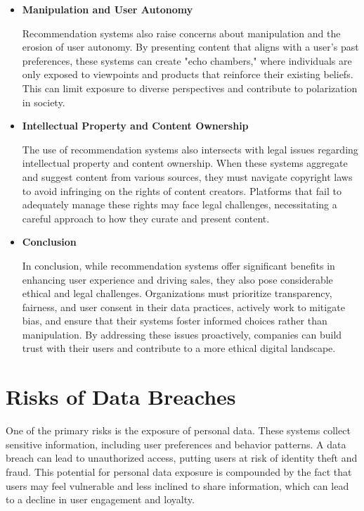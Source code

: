 \documentclass[10pt,twoside,slovak,a4paper]{article}
\begin{document}
\begin{itemize}
\item \textbf{Manipulation and User Autonomy} 

Recommendation systems also raise concerns about manipulation and the erosion of user autonomy\cite{problems}. By presenting content that aligns with a user’s past preferences, these systems can create "echo chambers," where individuals are only exposed to viewpoints and products that reinforce their existing beliefs. This can limit exposure to diverse perspectives and contribute to polarization in society.


\item \textbf{Intellectual Property and Content Ownership} 

The use of recommendation systems also intersects with legal issues regarding intellectual property and content ownership\cite{ethical}. When these systems aggregate and suggest content from various sources, they must navigate copyright laws to avoid infringing on the rights of content creators. Platforms that fail to adequately manage these rights may face legal challenges, necessitating a careful approach to how they curate and present content.

\newpage
\item \textbf{Conclusion} 

In conclusion, while recommendation systems offer significant benefits in enhancing user experience and driving sales, they also pose considerable ethical and legal challenges. Organizations must prioritize transparency, fairness, and user consent in their data practices, actively work to mitigate bias, and ensure that their systems foster informed choices rather than manipulation. By addressing these issues proactively, companies can build trust with their users and contribute to a more ethical digital landscape.

\end{itemize}



\section{Risks of Data Breaches} \label{Risks of Data Breaches}

One of the primary risks is the exposure of personal data. These systems collect sensitive information, including user preferences and behavior patterns\cite{info}. A data breach can lead to unauthorized access, putting users at risk of identity theft and fraud. This potential for personal data exposure is compounded by the fact that users may feel vulnerable and less inclined to share information, which can lead to a decline in user engagement and loyalty.
\end{document}

